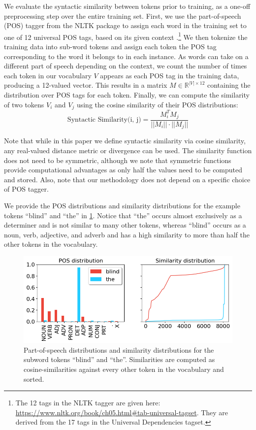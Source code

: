 We evaluate the syntactic similarity between tokens prior to training, as a one-off preprocessing step over the entire training set. First, we use the part-of-speech (POS) tagger from the NLTK package \citep{bird2009natural} to assign each word in the training set to one of 12 universal POS tags, based on its given context \citep{petrov2012universalpos}.\footnote{The 12 tags in the NLTK tagger are given here: \url{https://www.nltk.org/book/ch05.html\#tab-universal-tagset}. They are derived from the 17 tags in the Universal Dependencies tagset.} We then tokenize the training data into sub-word tokens and assign each token the POS tag corresponding to the word it belongs to in each instance. As words can take on a different part of speech depending on the context, we count the number of times each token in our vocabulary $V$ appears as each POS tag in the training data, producing a 12-valued vector. This results in a matrix $M \in \mathbb{R}^{|V|\times 12}$ containing the distribution over POS tags for each token. Finally, we can compute the similarity of two tokens $V_i$ and $V_j$ using the cosine similarity of their POS distributions: $$ \text{Syntactic Similarity(i, j)} = \frac{M_i^TM_j}{||M_i|| \cdot ||M_j||}$$ 


Note that while in this paper we define syntactic similarity via cosine similarity, any real-valued distance metric or divergence can be used. The similarity function does not need to be symmetric, although we note that symmetric functions provide computational advantages as only half the values need to be computed and stored. Also, note that our methodology does not depend on a specific choice of POS tagger.

We provide the POS distributions and similarity distributions for the example tokens ``blind'' and ``the'' in \cref{fig:distributions}. Notice that ``the'' occurs almost exclusively as a determiner and is not similar to many other tokens, whereas ``blind'' occurs as a noun, verb, adjective, and adverb and has a high similarity to more than half the other tokens in the vocabulary.

\begin{figure}[ht!]
    \centering
    \includegraphics[width=\linewidth]{chapters/syntatic-smoothing/figures/distributions.png}
    \caption{Part-of-speech distributions and similarity distributions for the subword tokens ``blind'' and ``the''. Similarities are computed as cosine-similarities against every other token in the vocabulary and sorted.}
    \label{fig:distributions}
    \vspace{-1em}
\end{figure}

